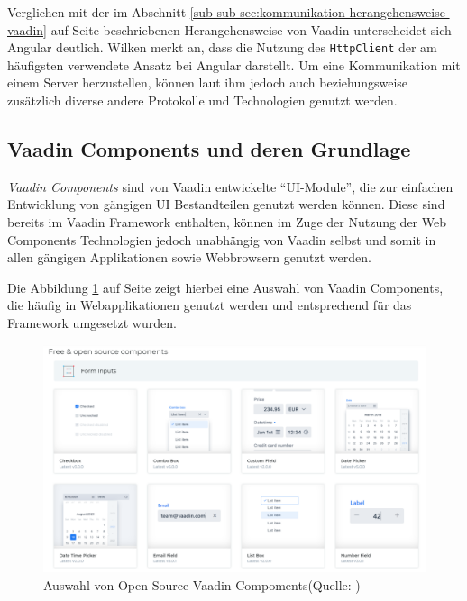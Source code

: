 \documentclass[a4paper,12pt,twoside]{scrreprt}
\begin{document}
Verglichen mit der im Abschnitt \ref{sub-sub-sec:kommunikation-herangehensweise-vaadin} auf Seite \pageref{sub-sub-sec:kommunikation-herangehensweise-vaadin} beschriebenen Herangehensweise von Vaadin unterscheidet sich Angular deutlich. Wilken merkt an, dass die Nutzung des \texttt{HttpClient} der am häufigsten verwendete Ansatz bei Angular darstellt. Um eine Kommunikation mit einem Server herzustellen, können laut ihm jedoch auch beziehungsweise zusätzlich diverse andere Protokolle und Technologien genutzt werden. \parencite[][]{wilken_angular_2018}

\subsection{Vaadin Components und deren Grundlage}
\label{sub-sec:vaadin-components}
\textit{Vaadin Components} sind von Vaadin entwickelte \enquote{\acs{UI}-Module}, die zur einfachen Entwicklung von gängigen \acl{UI} Bestandteilen genutzt werden können. Diese sind bereits im Vaadin Framework enthalten, können im Zuge der Nutzung der Web Components Technologien jedoch unabhängig von Vaadin selbst und somit in allen gängigen Applikationen sowie Webbrowsern genutzt werden. \parencite[][Seite 2ff.]{vaadin_ltd_vaadin_nodate-2}

Die Abbildung \ref{fig:vaadin-components-overview} auf Seite \pageref{fig:vaadin-components-overview} zeigt hierbei eine Auswahl von Vaadin Components, die häufig in Webapplikationen genutzt werden und entsprechend für das Framework umgesetzt wurden.

\begin{figure}[ht]
    \centering
    \includegraphics[scale=0.38]{images/Vaadin_Compoments_overview_Vaadin.png}
    \caption[Auswahl von Open Source Vaadin Compoments]{Auswahl von Open Source Vaadin Compoments\newline(Quelle: \cite[][]{vaadin_ltd_mobile_nodate})}
    \label{fig:vaadin-components-overview}
\end{figure}
\end{document}
